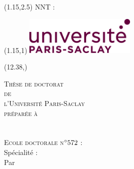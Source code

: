 \begin{textblock}{13}(1.15,2.5)
  NNT : \NNT
\end{textblock}


\begin{textblock}{1}(1.15,1)
\includegraphics[height=1.8cm]{Figures/Logos/UPSac.png} %
\label{Logo Paris Saclay}
\end{textblock}

\begin{textblock}{2.47}(12.38,\vpos)
\logoEt %
\label{Logo Etablissement}
\end{textblock}

\vspace*{1cm}
\color{blue!20!red!45!black} %
  \begin{center}    
    \LARGE\textsc{Thèse de doctorat\\ de\\ l'Université Paris-Saclay} \\
    \LARGE{\textsc{préparée à \\ \PhDworkingplace}} \\ \bigskip
  \color{black} %
	\bigskip 
	\Large{\textsc{\laboratory}}\\
	\bigskip
    \Large{\textsc{Ecole doctorale n$^{\circ}572$ :}} %
     \Large{\ecodoctitle}  \\

     \Large{Spécialité : \PhDspeciality} \\%
    \vfill
    \Large{Par} \\ %
    \bigskip
		\bigskip
		   \LARGE{{\textsc{\PhDname}}}\\
   \bigskip
	\bigskip
	\bigskip
	\LARGE{\textbf{\textsc{\PhDTitleFR}}}
    \vfill
    \bigskip
		\vspace{3in}
\end{center}
\color{black}

%


